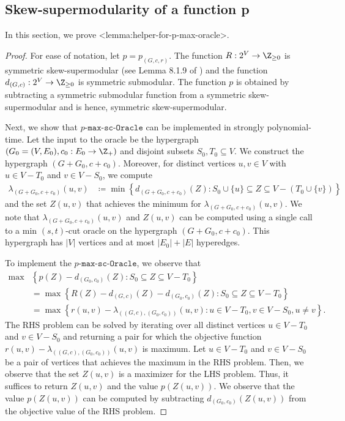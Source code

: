 \documentclass{article}
\def\Cref#1{<#1>}%
\def\({}
\def\){}
\newcommand{\functionMaximizationOracleStrongCover}[1]{\ensuremath{{#1}\text{-}\mathtt{max}\text{-}\mathtt{sc}\text{-}\mathtt{Oracle}}\xspace}
\begin{document}
\subsection{Skew-supermodularity of a function \(p\)}\label{sec:helper-for-p-max-oracle}
In this section, we prove \Cref{lemma:helper-for-p-max-oracle}. 
\lempmaxoracle*
\begin{proof}
    For ease of notation, let $p=p_{(G, c, r)}$. 
    The function $R:2^V\rightarrow \Z_{\ge 0}$ is symmetric skew-supermodular (see Lemma 8.1.9 of \cite{Frank-book}) and the function $d_{(G,c)}:2^V\rightarrow \Z_{\ge 0}$ is symmetric submodular. The function $p$ is obtained by subtracting a symmetric submodular function from a symmetric skew-supermodular and is hence, symmetric skew-supermodular. 

    Next, we show that \functionMaximizationOracleStrongCover{p} can be implemented in strongly polynomial-time. 
    Let the input to the oracle be the hypergraph $(G_0=(V, E_0), c_0: E_0\rightarrow \Z_+)$ and disjoint subsets $S_0, T_0\subseteq V$. 
    We construct the hypergraph $(G+G_0, c+c_0)$. Moreover, for distinct vertices $u, v\in V$ with $u\in V-T_0$ and $v\in V-S_0$, we compute  
    \begin{align*}
    \lambda_{(G+G_0, c+c_0)}(u, v)&\coloneqq \min\left\{d_{(G+G_0, c+c_0)}(Z): S_0\cup \{u\}\subseteq Z\subseteq V-(T_0\cup\{v\})\right\} 
    \end{align*}
    and the set $Z(u, v)$ that achieves the minimum for $\lambda_{(G+G_0, c+c_0)}(u, v)$. We note that $\lambda_{(G+G_0, c+c_0)}(u, v)$ and $Z(u,v)$ can be computed using a single call to a min $(s,t)$-cut oracle on the hypergraph $(G+G_0, c+c_0)$. This hypergraph has $|V|$ vertices and at most $|E_0|+|E|$ hyperedges.  

    To implement the \functionMaximizationOracleStrongCover{p}, we observe that 
    \begin{align*}
    \max&\left\{p(Z)-d_{(G_0, c_0)}(Z): S_0\subseteq Z\subseteq V-T_0\right\}\\
    &=\max\left\{R(Z)-d_{(G, c)}(Z)-d_{(G_0, c_0)}(Z): S_0\subseteq Z\subseteq V-T_0\right\}\\
    &=\max\left\{r(u, v)-\lambda_{((G, c), (G_0, c_0))}(u, v): u\in V-T_0, v\in V-S_0, u\neq v\right\}. 
    \end{align*}
    The RHS problem can be solved by iterating over all distinct vertices $u\in V-T_0$ and $v\in V-S_0$ and returning a pair for which the objective function $r(u, v)-\lambda_{((G, c), (G_0, c_0))}(u, v)$ is maximum. Let $u\in V-T_0$ and $v\in V-S_0$ be a pair of vertices that achieves the maximum in the RHS problem. Then, we observe that the set $Z(u, v)$ is a maximizer for the LHS problem. Thus, it suffices to return $Z(u, v)$ and the value $p(Z(u, v))$. We observe that the value $p(Z(u, v))$ can be computed by subtracting $d_{(G_0, c_0)}(Z(u,v))$ from the objective value of the RHS problem.


\end{proof}
\end{document}
